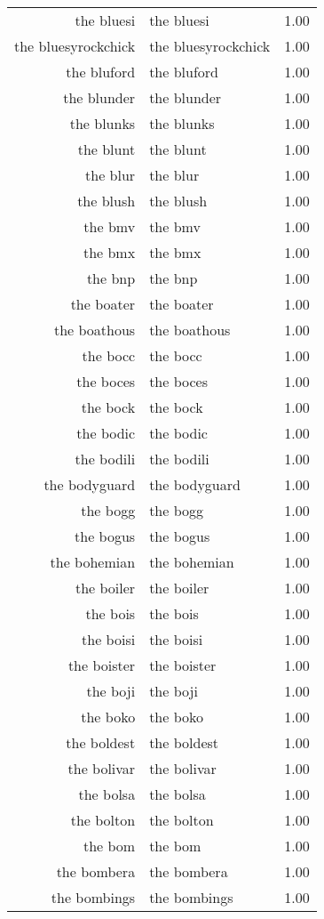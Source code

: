 \begin{table}[ht]
\begin{tabular}{rlr}
  the bluesi & the bluesi & 1.00 \\ 
  the bluesyrockchick & the bluesyrockchick & 1.00 \\ 
  the bluford & the bluford & 1.00 \\ 
  the blunder & the blunder & 1.00 \\ 
  the blunks & the blunks & 1.00 \\ 
  the blunt & the blunt & 1.00 \\ 
  the blur & the blur & 1.00 \\ 
  the blush & the blush & 1.00 \\ 
  the bmv & the bmv & 1.00 \\ 
  the bmx & the bmx & 1.00 \\ 
  the bnp & the bnp & 1.00 \\ 
  the boater & the boater & 1.00 \\ 
  the boathous & the boathous & 1.00 \\ 
  the bocc & the bocc & 1.00 \\ 
  the boces & the boces & 1.00 \\ 
  the bock & the bock & 1.00 \\ 
  the bodic & the bodic & 1.00 \\ 
  the bodili & the bodili & 1.00 \\ 
  the bodyguard & the bodyguard & 1.00 \\ 
  the bogg & the bogg & 1.00 \\ 
  the bogus & the bogus & 1.00 \\ 
  the bohemian & the bohemian & 1.00 \\ 
  the boiler & the boiler & 1.00 \\ 
  the bois & the bois & 1.00 \\ 
  the boisi & the boisi & 1.00 \\ 
  the boister & the boister & 1.00 \\ 
  the boji & the boji & 1.00 \\ 
  the boko & the boko & 1.00 \\ 
  the boldest & the boldest & 1.00 \\ 
  the bolivar & the bolivar & 1.00 \\ 
  the bolsa & the bolsa & 1.00 \\ 
  the bolton & the bolton & 1.00 \\ 
  the bom & the bom & 1.00 \\ 
  the bombera & the bombera & 1.00 \\ 
  the bombings & the bombings & 1.00 \\ 

\end{tabular}
\end{table}
